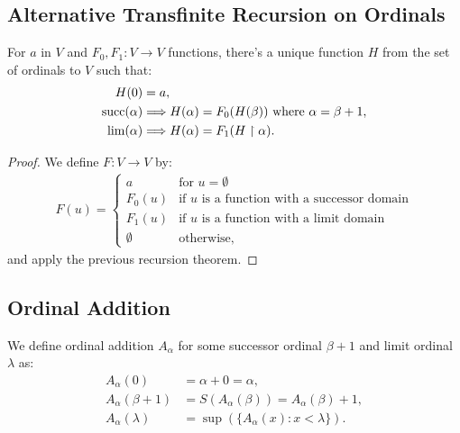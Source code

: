 \subsection{Alternative Transfinite Recursion on Ordinals}

For $a$ in $V$ and $F_0, F_1 : V \to V$ functions, there's a unique
function $H$ from the set of ordinals to $V$ such that: \begin{align*}
    H(0) &= a, \\
    \operatorname{succ}(\alpha) &\Longrightarrow H(\alpha) = F_0(H(\beta)) \text{ where } \alpha = \beta + 1, \\
    \lim(\alpha) &\Longrightarrow H(\alpha) = F_1(H \upharpoonright \alpha).
\end{align*}

\begin{proof}
    We define $F : V \to V$ by: \begin{align*}
        F(u) = \begin{cases}
            a & \text{for } u = \emptyset \\
            F_0(u) & \text{if } u \text{ is a function with a successor domain} \\
            F_1(u) & \text{if } u \text{ is a function with a limit domain} \\
            \emptyset & \text{otherwise},
        \end{cases}
    \end{align*} and apply the previous recursion theorem.
\end{proof}

\subsection{Ordinal Addition}

We define ordinal addition $A_\alpha$ for some successor ordinal
$\beta + 1$ and limit ordinal $\lambda$ as: \begin{align*}
    A_\alpha(0) &= \alpha + 0 = \alpha, \\
    A_\alpha(\beta + 1) &= S(A_\alpha(\beta)) = A_\alpha(\beta) + 1, \\
    A_\alpha(\lambda) &= \sup(\{A_\alpha(x) : x < \lambda\}).
\end{align*}